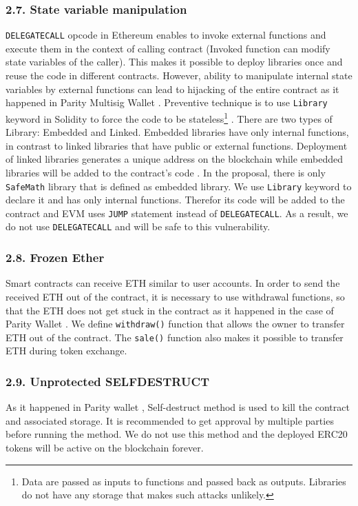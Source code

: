 \subsubsection*{2.7. State variable manipulation}
\texttt{DELEGATECALL} opcode in Ethereum enables to invoke external functions and execute them in the context of calling contract (\ie Invoked function can modify state variables of the caller). This makes it possible to deploy libraries once and reuse the code in different contracts. However, ability to manipulate internal state variables by external functions can lead to hijacking of the entire contract as it happened in Parity Multisig Wallet \cite{ParitySecondHack}. Preventive technique is to use \texttt{Library} keyword in Solidity to force the code to be stateless\footnote{Data are passed as inputs to functions and passed back as outputs. Libraries do not have any storage that makes such attacks unlikely.} \cite{LIB1}. There are two types of Library: Embedded and Linked. Embedded libraries have only internal functions, in contrast to linked libraries that have public or external functions. Deployment of linked libraries generates a unique address on the blockchain while embedded libraries will be added to the contract's code \cite{LIB2}. In the proposal, there is only \texttt{SafeMath} library that is defined as embedded library. We use \texttt{Library} keyword to declare it and has only internal functions. Therefor its code will be added to the contract and EVM uses \texttt{JUMP} statement instead of \texttt{DELEGATECALL}. As a result, we do not use \texttt{DELEGATECALL} and will be safe to this vulnerability.

\subsubsection*{2.8. Frozen Ether}
Smart contracts can receive ETH similar to user accounts. In order to send the received ETH out of the contract, it is necessary to use withdrawal functions, so that the ETH does not get stuck in the contract as it happened in the case of Parity Wallet \cite{ParityWalletHack}. We define \texttt{withdraw()} function that allows the owner to transfer ETH out of the contract. The \texttt{sale()} function also makes it possible to transfer ETH during token exchange.

\subsubsection*{2.9. Unprotected SELFDESTRUCT}
As it happened in Parity wallet \cite{ParitySecondHack}, Self-destruct method is used to kill the contract and associated storage. It is recommended to get approval by multiple parties before running the method. We do not use this method and the deployed ERC20 tokens will be active on the blockchain forever.

